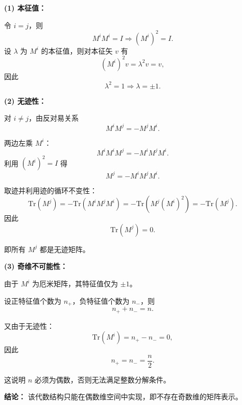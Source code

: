 \begin{solution}[Clifford代数性质与维数约束]
\answer

\vspace{0.3em}
\textbf{(1) 本征值：}

令 $i=j$，则
\[
M^iM^i=I \Rightarrow (M^i)^2=I.
\]
设 $\lambda$ 为 $M^i$ 的本征值，则对本征矢 $v$ 有
\[
(M^i)^2 v = \lambda^2 v = v,
\]
因此
\[
\lambda^2=1 \Rightarrow \lambda=\pm1.
\]

\vspace{0.5em}
\textbf{(2) 无迹性：}

对 $i\neq j$，由反对易关系
\[
M^iM^j=-M^jM^i.
\]

两边左乘 $M^i$：
\[
M^iM^iM^j=-M^iM^jM^i.
\]
利用 $(M^i)^2=I$ 得
\[
M^j=-M^iM^jM^i.
\]

取迹并利用迹的循环不变性：
\[
\mathrm{Tr}(M^j)= -\mathrm{Tr}(M^iM^jM^i)
= -\mathrm{Tr}(M^j(M^i)^2)
= -\mathrm{Tr}(M^j).
\]
因此
\[
\mathrm{Tr}(M^j)=0.
\]

即所有 $M^j$ 都是无迹矩阵。

\vspace{0.5em}
\textbf{(3) 奇维不可能性：}

由于 $M^i$ 为厄米矩阵，其特征值仅为 $\pm1$。

设正特征值个数为 $n_+$，负特征值个数为 $n_-$，则
\[
n_+ + n_- = n.
\]

又由于无迹性：
\[
\mathrm{Tr}(M^i)=n_+ - n_- = 0,
\]
因此
\[
n_+=n_-=\frac{n}{2}.
\]

这说明 $n$ 必须为偶数，否则无法满足整数分解条件。

\vspace{0.5em}
\textbf{结论：}
该代数结构只能在偶数维空间中实现，即不存在奇数维的矩阵表示。
\end{solution}

